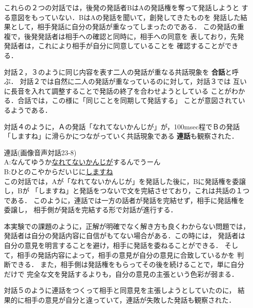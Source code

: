 \vspace{-3mm}
これらの２つの対話では，後発の発話者BはAの発話権を奪って発話しようと
する意図をもっていない．BはAの発話を聞いて，創発してきたものを
発話した結果として，相手発話に自分の発話が重なってしまったのである．
この発話の重複で，後発発話者は相手への確認と同時に，相手への同意を
表しており，先発発話者は，これにより相手が自分に同意していることを
確認することができる．

対話２，３のように同じ内容を表す二人の発話が重なる共話現象を
{\bf 合話}\cite{Ito1996}と呼ぶ．
対話２では自然に二人の発話が重なっているのに対して，対話３では
互いに長音を入れて調整することで発話の終了を合わせようとしている
ことがわかる．合話では，この様に「同じことを同期して発話する」
ことが意図されているようである．

対話４のように，Ａの発話「なれてないかんじが」が，100msec程でＢの発話
「しますね」に滑らかにつながっていく共話現象である
{\bf 連話}\cite{Ito1996}も観察された．

\hspace*{-0.5cm}{\bf 対話４}\hspace{0.33cm}連話(画像音声対話23-8)\\
A:なんてゆうか\hspace{2.7cm}\underline{なれてないかんじが}\hspace{1.3cm}するんでうーん\\
B:\hspace{1.0cm}ひとのこやからだいじに\hspace{3.0cm}\underline{しますね}\\

この対話では，Aが「なれてないかんじが」を発話した後に，Bに発話権を委譲し，Bが
「しますね」と発話をつないで文を完結させており，これは共話の１つである．
このように，連話では一方の話者が発話を完結せず，相手に発話権を委譲し，
相手側が発話を完結する形で対話が進行する．

本実験での課題のように，正解が明確でなく解き方も良くわからない問題では，
発話者は自分の発話内容に自信がもてない場合がある．この時には，
発話者は自分の意見を明言することを避け，相手に発話を委ねることができる．
そして，相手の発話内容によって，相手の意見が自分の意見に合致しているかを
判断できる．
また，相手側は発話権をもらってその後を続けることで，単に自分だけで
完全な文を発話するよりも，自分の意見の主張という色彩が弱まる．

対話５のように連話をつくって相手と同意見を主張しようとしていたのに，
結果的に相手の意見が自分と違っていて，連話が失敗した発話も観察された．

